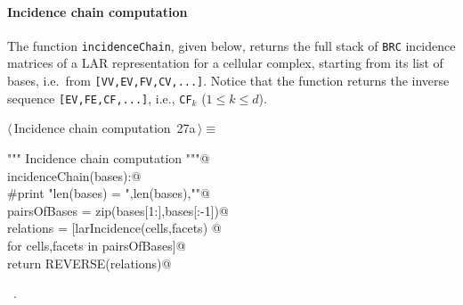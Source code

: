 \documentclass[11pt,oneside]{article}    %
\begin{document}
\paragraph{Incidence chain computation}
The function \texttt{incidenceChain}, given below, returns the full stack of \texttt{BRC} incidence matrices of a LAR representation for a cellular complex, starting from its list of bases, i.e.~from \texttt{[VV,EV,FV,CV,...]}. Notice that the function returns the inverse sequence 
\texttt{[EV,FE,CF,...]}, i.e., \texttt{CF}$_k$ ($1\leq k\leq d$).

\begin{flushleft} \small \label{scrap44}
\protect{}$\langle\,$Incidence chain computation\nobreak\ {\footnotesize 27a}$\,\rangle\equiv$
\vspace{-1ex}
\begin{list}{}{} \item
\mbox{}\verb@""" Incidence chain computation """@\\
\mbox{}\verb@def incidenceChain(bases):@\\
\mbox{}\verb@    #print "\n len(bases) = ",len(bases),"\n"@\\
\mbox{}\verb@    pairsOfBases = zip(bases[1:],bases[:-1])@\\
\mbox{}\verb@    relations = [larIncidence(cells,facets) @\\
\mbox{}\verb@                    for cells,facets in pairsOfBases]@\\
\mbox{}\verb@    return REVERSE(relations)@\\
\mbox{}\verb@@{\NWsep}
\end{list}
\vspace{-1ex}
\footnotesize\addtolength{\baselineskip}{-1ex}
\begin{list}{}{\setlength{\itemsep}{-\parsep}\setlength{\itemindent}{-\leftmargin}}
\item \NWtxtMacroRefIn\ .
\end{list}
\end{flushleft}
\end{document}
